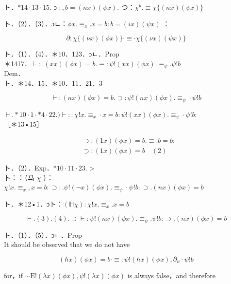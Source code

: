 \documentclass[10pt]{article}
\begin{document}
ト．$* 14 \cdot 13 \cdot 15$. ɔ $:, b=(n x)(\psi x)$. つ：$\chi^{b} . \equiv \chi\{(n x)(\psi x)\}$

ト．（2）．（3）．ɔㄴ：$\phi x . \equiv_{x} . x=b: b=(i x)(\psi x)$ ：


\begin{equation*}
\partial: \chi\{(\nu x)(\phi x)\} \cdot \equiv \cdot \chi\{(\nu x)(\psi x)\} \tag{4}
\end{equation*}


ト．（1）．（4）．＊10．123．ɔㄴ．Prop\\
＊1417．$\vdash: .(x x)(\phi x)=b . \equiv: \psi!(x x)(\phi x) . \equiv_{\psi} . \psi!b$\\
Dem．\\
ト．＊14．15．＊10．11．21．3


\begin{equation*}
\vdash:(n x)(\phi x)=b . \supset: \psi!(n x)(\phi x) . \equiv_{\psi} \cdot \psi!b \tag{1}
\end{equation*}


$\vdash . * 10 \cdot 1 \cdot * 4 \cdot 22.) \vdash:: \chi!x . \equiv_{x} \cdot x=b: \psi!(x x)(\phi x) . \equiv_{\psi} \cdot \psi!b:$\\
［＊13•15］


\begin{align*}
& \supset:(1 x)(\phi x)=b . \equiv . b=b: \\
& \supset:(1 x)(\phi x)=b \quad(2) \tag{2}
\end{align*}


ト．（2）．Exp．$* 10 \cdot 11 \cdot 23 .>$\\
ト：：（马 $\chi$ ）：$\chi!x . \equiv_{x}, x=b: \supset: . \psi!(\neg x)(\phi x) . \equiv_{\psi} \cdot \psi!b: \supset .(n x)(\phi x)=b$

ト．＊12•1．ɔト：$(\mathbb{H} \chi): \chi!x . \equiv_{x} . x=b$


\begin{equation*}
\vdash .(3) .(4) . \supset \vdash: \psi!(n x)(\phi x) . \equiv_{\psi} . \psi!b: \supset .(n x)(\phi x)=b \tag{4}
\end{equation*}


ト．（1）．（5）．ɔㄴ．Prop\\
It should be observed that we do not have

$$
(h x)(\phi x)=b \cdot \equiv: \psi!(h x)(\phi x), \partial_{\psi} \cdot \psi!b
$$

for，if $\sim \mathrm{E}!(\lambda x)(\phi x), \psi!(\lambda x)(\phi x)$ is always false，and therefore
\end{document}
